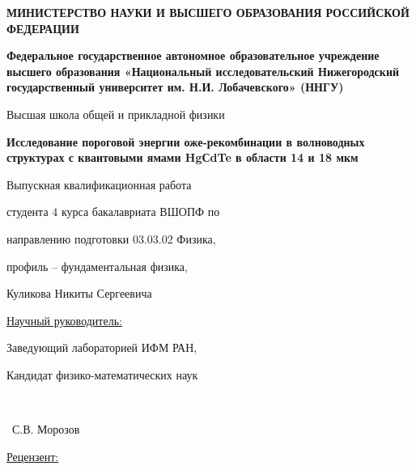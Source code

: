\documentclass[../main.tex]{subfiles}
\begin{document}
\begin{titlepage}
    \begin{center}
    \textbf{МИНИСТЕРСТВО НАУКИ И ВЫСШЕГО ОБРАЗОВАНИЯ РОССИЙСКОЙ ФЕДЕРАЦИИ}
    
    \textbf{Федеральное государственное автономное образовательное учреждение высшего образования «Национальный исследовательский Нижегородский государственный университет им. Н.И. Лобачевского» (ННГУ)}
    
    \vspace{0.1cm}
    Высшая школа общей и прикладной физики
    
    \end{center}
    
    
    \begin{center}
    \Large{\bf{Исследование пороговой энергии оже-рекомбинации в волноводных структурах с квантовыми ямами HgСdTe в области 14 и 18 мкм}}
    \end{center}
    
    \begin{flushright}
    Выпускная квалификационная работа
    
    студента 4 курса бакалавриата  ВШОПФ по
    
    направлению подготовки 03.03.02 Физика,
    
    профиль – фундаментальная физика,
    
    Куликова Никиты Сергеевича
    
    \vspace{0.1 cm}
    \underline{Научный руководитель:}
    
    Заведующий лабораторией ИФМ РАН,
    
    Кандидат физико-математических наук
    
    \begin{minipage}[t][0.1 cm][t]{2in}
      \underline{\hspace{2in}}\\ %
      \centering
    \end{minipage}~С.В. Морозов
    
    \vspace{0.1 cm}
     \underline{Рецензент:}
    

\end{flushright}
\end{titlepage}
\end{document}
